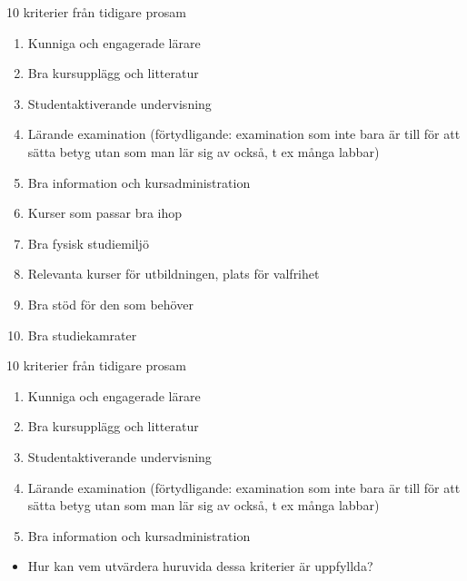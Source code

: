 \begin{frame}
  \begin{block}{10 kriterier från tidigare prosam}
    \begin{enumerate}
      \item Kunniga och engagerade lärare
      \item Bra kursupplägg och litteratur
      \item Studentaktiverande undervisning
      \item Lärande examination (förtydligande: examination som inte bara är 
        till för att sätta betyg utan som man lär sig av också, t ex många 
        labbar)
      \item Bra information och kursadministration
      \item Kurser som passar bra ihop
      \item Bra fysisk studiemiljö
      \item Relevanta kurser för utbildningen, plats för valfrihet
      \item Bra stöd för den som behöver
      \item Bra studiekamrater
    \end{enumerate}
  \end{block}
\end{frame}

\begin{frame}
  \begin{block}{10 kriterier från tidigare prosam}
    \begin{enumerate}
      \item Kunniga och engagerade lärare
      \item Bra kursupplägg och litteratur
      \item Studentaktiverande undervisning
      \item Lärande examination (förtydligande: examination som inte bara är 
        till för att sätta betyg utan som man lär sig av också, t ex många 
        labbar)
      \item Bra information och kursadministration
        \saveenumi
    \end{enumerate}
  \end{block}

  \begin{question}
    \begin{itemize}
      \item Hur kan vem utvärdera huruvida dessa kriterier är uppfyllda?
    \end{itemize}
  \end{question}
\end{frame}

